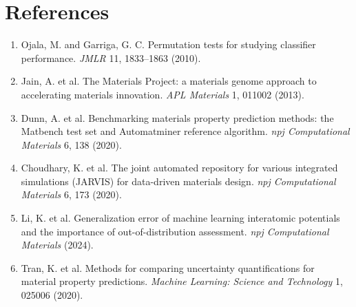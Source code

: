 \documentclass[10pt,a4paper]{article}
\begin{document}
\section*{References}\small
\begin{enumerate}
\item Ojala, M. and Garriga, G. C. Permutation tests for studying classifier performance. \emph{JMLR} 11, 1833--1863 (2010).
\item Jain, A. et al. The Materials Project: a materials genome approach to accelerating materials innovation. \emph{APL Materials} 1, 011002 (2013).
\item Dunn, A. et al. Benchmarking materials property prediction methods: the Matbench test set and Automatminer reference algorithm. \emph{npj Computational Materials} 6, 138 (2020).
\item Choudhary, K. et al. The joint automated repository for various integrated simulations (JARVIS) for data-driven materials design. \emph{npj Computational Materials} 6, 173 (2020).
\item Li, K. et al. Generalization error of machine learning interatomic potentials and the importance of out-of-distribution assessment. \emph{npj Computational Materials} (2024).
\item Tran, K. et al. Methods for comparing uncertainty quantifications for material property predictions. \emph{Machine Learning: Science and Technology} 1, 025006 (2020).
\end{enumerate}
\end{document}
